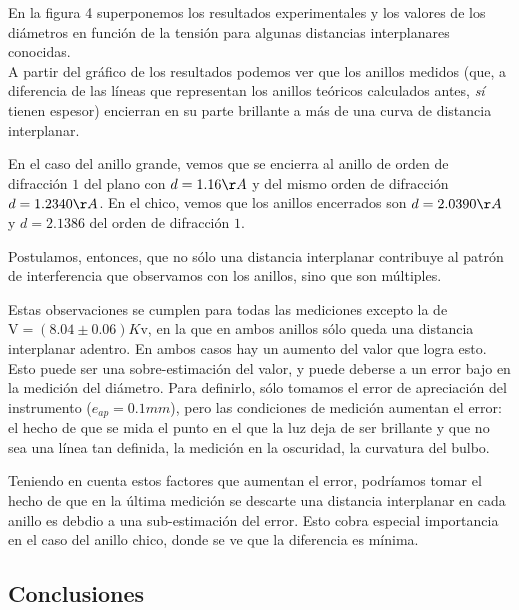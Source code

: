 \documentclass[]{article}
\begin{document}
En la figura 4 superponemos los resultados experimentales y los valores
de los diámetros en función de la tensión para algunas distancias
interplanares conocidas.\\
A partir del gráfico de los resultados podemos ver que los anillos
medidos (que, a diferencia de las líneas que representan los anillos
teóricos calculados antes, \emph{sí} tienen espesor) encierran en su
parte brillante a más de una curva de distancia interplanar.

En el caso del anillo grande, vemos que se encierra al anillo de orden
de difracción \(1\) del plano con \(d = 1.16\AA\) y del mismo orden de
difracción \(d = 1.2340\AA\). En el chico, vemos que los anillos
encerrados son \(d = 2.0390\AA\) y \(d = 2.1386\) del orden de
difracción \(1\).

Postulamos, entonces, que no sólo una distancia interplanar contribuye
al patrón de interferencia que observamos con los anillos, sino que son
múltiples.

Estas observaciones se cumplen para todas las mediciones excepto la de
\(\mathrm{V} = (8.04 \pm 0.06)K\mathrm{v}\), en la que en ambos anillos
sólo queda una distancia interplanar adentro. En ambos casos hay un
aumento del valor que logra esto. Esto puede ser una sobre-estimación
del valor, y puede deberse a un error bajo en la medición del diámetro.
Para definirlo, sólo tomamos el error de apreciación del instrumento
(\(e_{ap} = 0.1mm\)), pero las condiciones de medición aumentan el
error: el hecho de que se mida el punto en el que la luz deja de ser
brillante y que no sea una línea tan definida, la medición en la
oscuridad, la curvatura del bulbo.

Teniendo en cuenta estos factores que aumentan el error, podríamos tomar
el hecho de que en la última medición se descarte una distancia
interplanar en cada anillo es debdio a una sub-estimación del error.
Esto cobra especial importancia en el caso del anillo chico, donde se ve
que la diferencia es mínima.

\hypertarget{conclusiones}{%
\subsection{Conclusiones}\label{conclusiones}}
\end{document}
